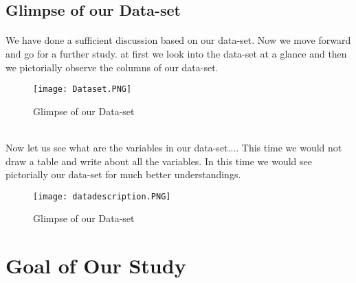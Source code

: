 \documentclass[A4paper,11pt]{report}
\begin{document}
	\subsection{Glimpse of our Data-set}
	\paragraph{} We have done a sufficient discussion based on our data-set. Now we move forward and go for a further study. at first we look into the data-set at a glance and then we pictorially observe the columns of our data-set.\\
	\begin{figure}[h!]
		\centering
		\texttt{[image: Dataset.PNG]}
		\caption{Glimpse of our Data-set}
	\end{figure}\\
	Now let us see what are the variables in our data-set....
	This time we would not draw a table and write about all the variables. In this time we would see pictorially our data-set for much better understandings.
	\begin{figure}[h]
		\centering
		\texttt{[image: datadescription.PNG]}
		\caption{Glimpse of our Data-set}
	\end{figure}
	\section{Goal of Our Study}
		
\end{document}
